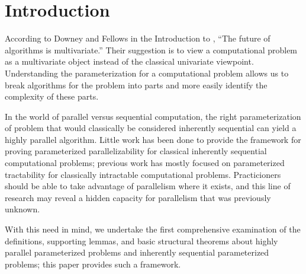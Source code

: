 \section{Introduction}

%
%
%
According to Downey and Fellows in the Introduction to \autocite{df13}, ``The future of algorithms is multivariate.''
Their suggestion is to view a computational problem as a multivariate object instead of the classical univariate viewpoint.
Understanding the parameterization for a computational problem allows us to break algorithms for the problem into parts and more easily identify the complexity of these parts.

%
%
%
In the world of parallel versus sequential computation, the right parameterization of problem that would classically be considered inherently sequential can yield a highly parallel algorithm.
Little work has been done to provide the framework for proving parameterized parallelizability for classical inherently sequential computational problems; previous work has mostly focused on parameterized tractability for classically intractable computational problems.
Practicioners should be able to take advantage of parallelism where it exists, and this line of research may reveal a hidden capacity for parallelism that was previously unknown.

%
%
%
With this need in mind, we undertake the first comprehensive examination of the definitions, supporting lemmas, and basic structural theorems about highly parallel parameterized problems and inherently sequential parameterized problems;
%
%
%
this paper provides such a framework.

